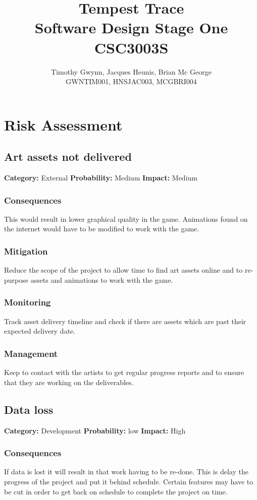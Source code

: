 \documentclass[a4paper,10pt]{article}
\title{Tempest Trace \\
Software Design Stage One
\\
CSC3003S}
\author{Timothy Gwynn, Jacques Heunis, Brian Mc George\\
GWNTIM001, HNSJAC003, MCGBRI004}
\begin{document}
\maketitle
\newpage
\tableofcontents
\newpage

\section{Risk Assessment}
\subsection{Art assets not delivered}
\textbf{Category:} External\newline
\textbf{Probability:} Medium\newline
\textbf{Impact:} Medium
\subsubsection*{Consequences}
This would result in lower graphical quality in the game.
Animations found on the internet would have to be modified to work with the game.
\subsubsection*{Mitigation}
Reduce the scope of the project to allow time to find art assets online and to re-purpose assets and animations to work with the game.
\subsubsection*{Monitoring}
Track asset delivery timeline and check if there are assets which are past their expected delivery date.
\subsubsection*{Management}
Keep to contact with the artists to get regular progress reports and to ensure that they are working on the deliverables. 

\subsection{Data loss}
\textbf{Category:} Development\newline
\textbf{Probability:} low\newline
\textbf{Impact:} High
\subsubsection*{Consequences}
If data is lost it will result in that work having to be re-done. This is delay the progress of the project and put it behind schedule. Certain features may have to be cut in order to get back on schedule to complete the project on time.
\end{document}
